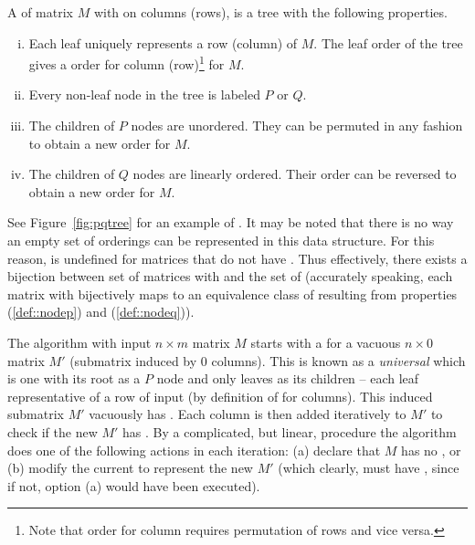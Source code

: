 \begin{definition}
  A \PQtree of matrix $M$ with \COP on columns (rows), is a tree with
  the following properties.
  \begin{enumerate}[i.]
    \singlespacing
  \item Each leaf uniquely represents a row (column) of $M$. The leaf
    order of the tree gives a \COP order for column (row)\footnote{Note
      that \COP order for column requires permutation of rows and vice
      versa.} for $M$.
  \item Every non-leaf node in the tree is labeled $P$ or $Q$.
  \item \label{def::nodep} The children of $P$ nodes are
    unordered. They can be permuted in any fashion to obtain a new
    \COP order for $M$.
  \item \label{def::nodeq} The children of $Q$ nodes are linearly
    ordered. Their order can be reversed to obtain a new \COP
    order for $M$.
  \end{enumerate}
  \label{def:pqtree}
\end{definition}

See Figure~\ref{fig:pqtree} for an example of \PQtree. It may be noted
that there is no way an empty set of \COP orderings can be represented
in this data structure. For this reason, \PQtree is undefined for
matrices that do not have \COP.  Thus effectively, there exists a
bijection between set of matrices with \COP and the set of \PQtrees
(accurately speaking, each matrix with \COP bijectively maps to an
equivalence class of \PQtrees resulting from properties (\ref{def::nodep}) and
(\ref{def::nodeq})).


\figpqtree

The \cite{bl76} algorithm with input $n \times m$ matrix $M$ starts
with a \PQtree for a vacuous $n \times 0$ matrix $M'$ (submatrix
induced by 0 columns). This is known as a {\em universal} \PQtree
which is one with its root as a $P$ node and only leaves as its
children -- each leaf representative of a row of input (by definition
of \COP for columns). This induced submatrix $M'$ vacuously has \COP.
Each column is then added iteratively to $M'$ to check if the new $M'$
has \COP.  By a complicated, but linear, procedure the algorithm does
one of the following actions in each iteration: (a) declare that $M$
has no \COP, or (b) modify the current \PQtree to represent the new
$M'$ (which clearly, must have \COP, since if not, option (a) would
have been executed).


